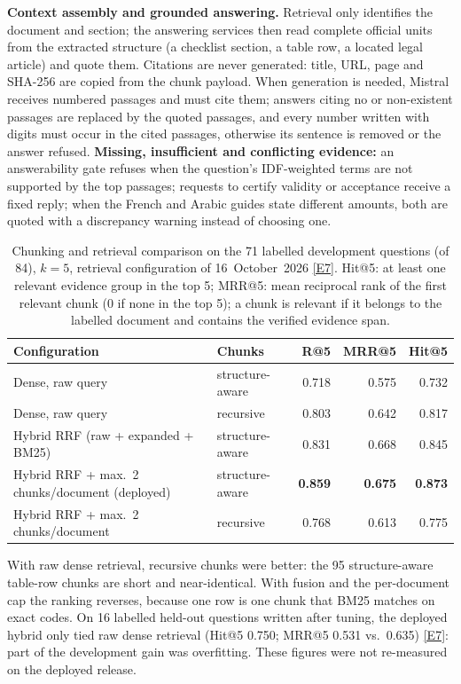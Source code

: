 \documentclass[10pt,a4paper]{article}
\newcommand{\ev}[1]{\hyperref[app:evidence]{[#1]}}
\begin{document}
\textbf{Context assembly and grounded answering.} Retrieval only identifies the document and section; the
answering services then read complete official units from the extracted structure (a checklist section, a
table row, a located legal article) and quote them. Citations are never generated: title, URL, page and
SHA-256 are copied from the chunk payload. When generation is needed, Mistral receives numbered passages and
must cite them; answers citing no or non-existent passages are replaced by the quoted passages, and every
number written with digits must occur in the cited passages, otherwise its sentence is removed or the answer
refused. \textbf{Missing, insufficient and conflicting evidence:} an answerability gate refuses when the
question's IDF-weighted terms are not supported by the top passages; requests to certify validity or
acceptance receive a fixed reply; when the French and Arabic guides state different amounts, both are quoted
with a discrepancy warning instead of choosing one.

\begin{table}[H]
  \centering\footnotesize
  \caption{Chunking and retrieval comparison on the 71 labelled development questions (of 84), $k=5$,
  retrieval configuration of 16~October~2026 \ev{E7}. Hit@5: at least one relevant evidence group in the top 5;
  MRR@5: mean reciprocal rank of the first relevant chunk (0 if none in the top 5); a chunk is relevant if it
  belongs to the labelled document and contains the verified evidence span.}\label{tab:retrieval}
  \begin{tabular}{@{}llrrr@{}}
  \toprule
  Configuration & Chunks & R@5 & MRR@5 & Hit@5 \\
  \midrule
  Dense, raw query & structure-aware & 0.718 & 0.575 & 0.732 \\
  Dense, raw query & recursive & 0.803 & 0.642 & 0.817 \\
  Hybrid RRF (raw + expanded + BM25) & structure-aware & 0.831 & 0.668 & 0.845 \\
  Hybrid RRF + max.\ 2 chunks/document (deployed) & structure-aware & \textbf{0.859} & \textbf{0.675} & \textbf{0.873} \\
  Hybrid RRF + max.\ 2 chunks/document & recursive & 0.768 & 0.613 & 0.775 \\
  \bottomrule
  \end{tabular}
\end{table}

With raw dense retrieval, recursive chunks were better: the 95 structure-aware table-row chunks are short and
near-identical. With fusion and the per-document cap the ranking reverses, because one row is one chunk that
BM25 matches on exact codes. On 16 labelled held-out questions written after tuning, the deployed hybrid only
tied raw dense retrieval (Hit@5 0.750; MRR@5 0.531 vs.\ 0.635) \ev{E7}: part of the development gain was
overfitting. These figures were not re-measured on the deployed release.
\end{document}
